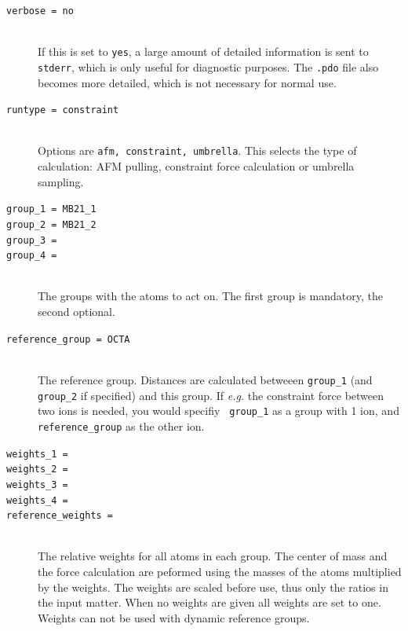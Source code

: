 \begin{description}

\item[\tt verbose                  = no]\mbox{}\\
If this is set to {\tt yes}, a large amount of detailed information
is sent to {\tt stderr}, which is only useful for diagnostic
purposes. The {\tt .pdo} file also becomes more detailed, which is not
necessary for normal use.

\item[\tt runtype                  = constraint]\mbox{}\\
Options are {\tt afm, constraint, umbrella}. This selects
the type of calculation: AFM pulling, constraint force calculation
or umbrella sampling.

\item[\tt group\_1                  = MB21\_1]
\item[\tt group\_2                  = MB21\_2]
\item[\tt group\_3                  = ]
\item[\tt group\_4                  = ]\mbox{}\\      
The groups with the atoms to act on. The first group is mandatory, the
second optional.

\item[\tt reference\_group          = OCTA]\mbox{}\\
The reference group. Distances are calculated betweeen {\tt group\_1}
(and {\tt group\_2} if specified) and this group. If \emph{e.g.} the
constraint force between two ions is needed, you would specifiy {\tt
group\_1} as a group with 1 ion, and {\tt reference\_group} as the other
ion.

\item[\tt weights\_1                  = ]
\item[\tt weights\_2                  = ]
\item[\tt weights\_3                  = ]
\item[\tt weights\_4                  = ]
\item[\tt reference\_weights          = ]\mbox{}\\
The relative weights for all atoms in each group.
The center of mass and the force calculation are peformed using
the masses of the atoms multiplied by the weights.
The weights are scaled before use, thus only the ratios in the input matter.
When no weights are given all weights are set to one.
Weights can not be used with dynamic reference groups.


\end{description}
